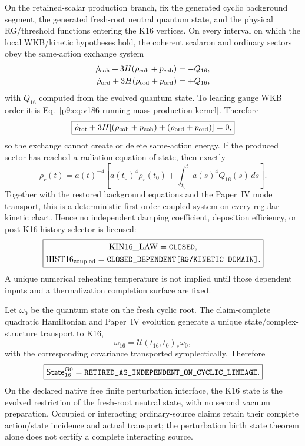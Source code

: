 \documentclass[12pt,a4paper]{article}
\begin{document}
\begin{theorem}
\label{p9:thm:v187-k16-coupled-evolution}
On the retained-scalar production branch, fix the generated
cyclic background segment, the generated fresh-root neutral quantum state, and the physical RG/threshold functions entering the K16 vertices.  On every
interval on which the local WKB/kinetic hypotheses hold, the coherent
scalaron and ordinary sectors obey the same-action exchange system
\begin{align}
 \dot\rho_{\rm coh}+3H(\rho_{\rm coh}+p_{\rm coh})&=-Q_{16},\\
 \dot\rho_{\rm ord}+3H(\rho_{\rm ord}+p_{\rm ord})&=+Q_{16},
\end{align}
with \(Q_{16}\) computed from the evolved quantum state.  To leading gauge
WKB order it is Eq.~\eqref{p9:eq:v186-running-mass-production-kernel}.
Therefore
\[
 \boxed{\dot\rho_{\rm tot}
 +3H[(\rho_{\rm coh}+p_{\rm coh})+(\rho_{\rm ord}+p_{\rm ord})]=0,}
\]
so the exchange cannot create or delete same-action energy.  If the produced
sector has reached a radiation equation of state, then exactly
\[
 \boxed{
 \rho_r(t)=a(t)^{-4}\left[a(t_0)^4\rho_r(t_0)
 +\int_{t_0}^{t}a(s)^4Q_{16}(s)\,ds\right].}
\]
Together with the restored background equations and the Paper~IV mode
transport, this is a deterministic first-order coupled system on every regular
kinetic chart.  Hence no independent damping coefficient, deposition
efficiency, or post-K16 history selector is licensed:
\[
 \boxed{\begin{gathered}
 \mathrm{KIN16\_LAW}=\texttt{CLOSED},\\
 \mathrm{HIST16}_{\rm coupled}
 =\texttt{CLOSED\_DEPENDENT[RG/KINETIC\ DOMAIN]}.
 \end{gathered}}
\]
A unique numerical reheating temperature is not implied until those dependent
inputs and a thermalization completion surface are fixed.
\end{theorem}

\begin{corollary}
\label{p9:cor:v187-k16-state-inheritance}
Let \(\omega_0\) be the quantum state on the fresh cyclic root.  The
claim-complete quadratic Hamiltonian and Paper~IV evolution generate a unique
state/complex-structure transport to K16,
\[
 \boxed{\omega_{16}=\mathcal U(t_{16},t_0)_*\omega_0,}
\]
with the corresponding covariance transported symplectically.  Therefore
\[
 \boxed{\mathsf{State}^{\rm G0}_{16}
 =\texttt{RETIRED\_AS\_INDEPENDENT\_ON\_CYCLIC\_LINEAGE}.}
\]
On the declared native free finite perturbation interface, the K16 state is
the evolved restriction of the fresh-root neutral state, with no second vacuum
preparation.  Occupied or interacting ordinary-source claims retain their
complete action/state incidence and actual transport; the perturbation birth
state theorem alone does not certify a complete interacting source.
\end{corollary}
\end{document}
